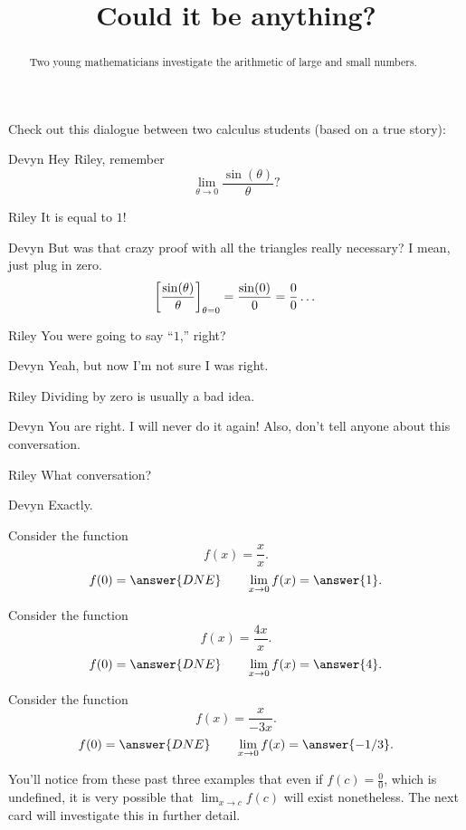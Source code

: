 \documentclass{ximera}
\title[Break-Ground:]{Could it be anything?}
\begin{document}
\begin{abstract}
Two young mathematicians investigate the arithmetic of large
and small numbers.
\end{abstract}
\maketitle


Check out this dialogue between two calculus students (based on a true
story):


\begin{dialogue}
\item[Devyn] Hey Riley, remember
  \[
  \lim_{\theta\to 0}\frac{\sin(\theta)}{\theta}?
  \]
\item[Riley] It is equal to $1$!
\item[Devyn] But was that crazy proof with all the triangles really
  necessary? I mean, just plug in zero. 
  \[
  \bigg[ \frac{\sin(\theta)}{\theta} \bigg]_{\theta=0} = \frac{\sin(0)}{0}=\frac{0}{0}\dots
  \]
  \item[Riley] You were going to say ``$1$,'' right? 
  \item[Devyn] Yeah, but now I'm not sure I was right.
  \item[Riley] Dividing by zero is usually a bad idea.
  \item[Devyn] You are right. I will never do it again! Also, don't
    tell anyone about this conversation.
  \item[Riley] What conversation?
  \item[Devyn] Exactly.
\end{dialogue}



\begin{problem}
  Consider the function
  \[
  f(x) = \frac{x}{x}.
  \]
  \[
  f(0) = \answer{DNE}\qquad\lim_{x\to 0} f(x) = \answer{1}.
  \]
\end{problem}

\begin{problem}
  Consider the function
  \[
  f(x) = \frac{4x}{x}.
  \]
  \[
  f(0) = \answer{DNE}\qquad\lim_{x\to 0} f(x) = \answer{4}.
  \]
\end{problem}

\begin{problem}
  Consider the function
  \[
  f(x) = \frac{x}{-3x}.
  \]
  \[
  f(0) = \answer{DNE}\qquad\lim_{x\to 0} f(x) = \answer{-1/3}.
  \]
  
  \begin{feedback}[correct]
  You'll notice from these past three examples that even if $f(c) = \frac{0}{0}$, which is undefined, it is very possible that $\displaystyle\lim_{x \to c} f(c)$ will exist nonetheless.  The next card will investigate this in further detail. 
  \end{feedback}
\end{problem}

%
\end{document}
